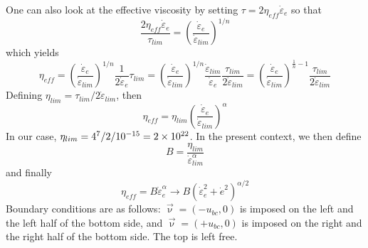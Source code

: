 One can also look at the effective viscosity by 
setting $\tau = 2 \eta_{eff} \dot{\varepsilon}_e$ so that
\[
\frac{2 \eta_{eff}\dot{\varepsilon}_e }{\tau_{lim}} = 
\left( \frac{ \dot{\varepsilon}_e  }{ \dot{\varepsilon}_{lim}  }  \right)^{1/n}
\]
which yields
\[
\eta_{eff} = \left( \frac{ \dot{\varepsilon}_e  }{ \dot{\varepsilon}_{lim} } \right)^{1/n}   
\frac{1}{ 2\dot{\varepsilon}_e} \tau_{lim}
=
\left( \frac{ \dot{\varepsilon}_e  }{ \dot{\varepsilon}_{lim}  }  \right)^{1/n} 
\frac{\dot{\varepsilon}_{lim} }{\dot{\varepsilon}_e} \frac{\tau_{lim}   }{2 \dot{\varepsilon}_{lim}} 
=
\left( \frac{ \dot{\varepsilon}_e  }{ \dot{\varepsilon}_{lim}  }  \right)^{\frac{1}{n}-1}  
\frac{\tau_{lim}   }{2 \dot{\varepsilon}_{lim}} 
\]
Defining $\eta_{lim}=\tau_{lim} /  2 \dot{\varepsilon}_{lim}$, then
\[
\eta_{eff} = \eta_{lim} \left( \frac{ \dot{\varepsilon}_e  }{ \dot{\varepsilon}_{lim}  }  
\right)^{\alpha}
\]
In our case, $\eta_{lim}= 4\time 10^7/2/10^{-15}=2\times10^{22}$. 
In the present context, we then define
\[
B
= \frac{ \eta_{lim} }{\dot{\varepsilon}_{lim}^{\alpha}}
\]
and finally 
\[
\eta_{eff} = B \dot{\varepsilon}_e^\alpha \rightarrow B (\dot{\varepsilon}_e^2 + \dot{e}^2 )^{\alpha/2}
\]
Boundary conditions are as follows: $\vec{\upnu}=(-u_{bc},0)$ is imposed on the left and the left half 
of the bottom side, and $\vec{\upnu}=(+u_{bc},0)$ is imposed on the right and the right half
of the bottom side. The top is left free.  

